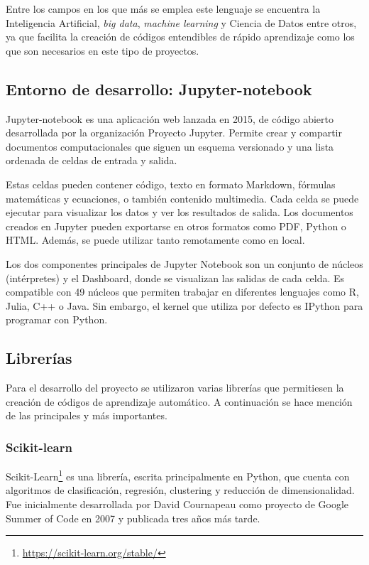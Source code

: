\documentclass[a4paper, 12pt]{book}
\begin{document}
Entre los campos en los que más se emplea este lenguaje se encuentra la Inteligencia Artificial, \textit{big data}, \textit{machine learning} y Ciencia de Datos entre otros, ya que facilita la creación de códigos entendibles de rápido aprendizaje como los que son necesarios en este tipo de proyectos.

\subsection{Entorno de desarrollo: Jupyter-notebook}
\label{subsec:entorno_de_desarrollo}

Jupyter-notebook es una aplicación web lanzada en 2015, de código abierto desarrollada por la organización Proyecto Jupyter. Permite crear y compartir documentos computacionales que siguen un esquema versionado y una lista ordenada de celdas de entrada y salida.

Estas celdas pueden contener código, texto en formato Markdown, fórmulas matemáticas y ecuaciones, o también contenido multimedia. Cada celda se puede ejecutar para visualizar los datos y ver los resultados de salida. Los documentos creados en Jupyter pueden exportarse en otros formatos como PDF, Python o HTML. Además, se puede utilizar tanto remotamente como en local.

Los dos componentes principales de Jupyter Notebook son un conjunto de núcleos (intérpretes) y el Dashboard, donde se visualizan las salidas de cada celda. Es compatible con 49 núcleos que permiten trabajar en diferentes lenguajes como R, Julia, C++ o Java. Sin embargo, el kernel que utiliza por defecto es IPython para programar con Python. 

\subsection{Librerías}
\label{subsec:Librerías}
Para el desarrollo del proyecto se utilizaron varias librerías que permitiesen la creación de códigos de aprendizaje automático. A continuación se hace mención de las principales y más importantes.

\subsubsection{Scikit-learn}
\label{subsubsec:Scikit-learn}
Scikit-Learn\footnote{\url{https://scikit-learn.org/stable/}} es una librería, escrita principalmente en Python, que cuenta con algoritmos de clasificación, regresión, clustering y reducción de dimensionalidad. Fue inicialmente desarrollada por David Cournapeau como proyecto de Google Summer of Code en 2007 y publicada tres años más tarde.
\end{document}
